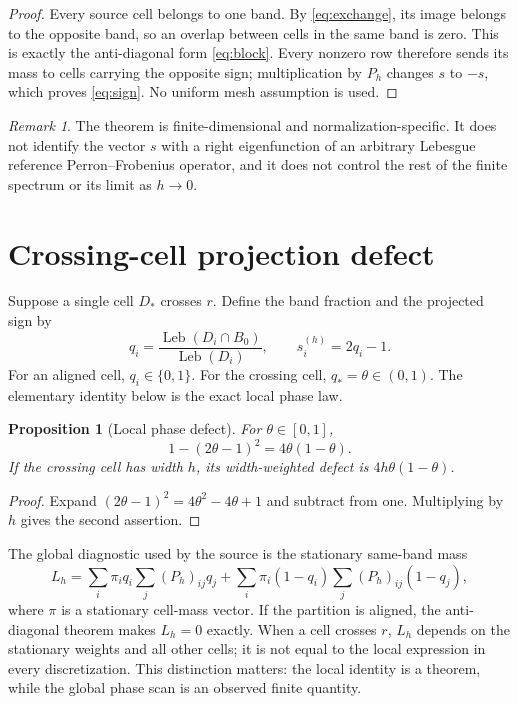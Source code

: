 \documentclass[11pt]{article}
\newtheorem{proposition}[theorem]{Proposition}
\theoremstyle{definition}
\theoremstyle{remark}
\newtheorem{remark}[theorem]{Remark}
\newcommand{\Bzero}{B_0}
\newcommand{\Leb}{\operatorname{Leb}}
\begin{document}
\begin{proof}
Every source cell belongs to one band.  By \eqref{eq:exchange}, its image
belongs to the opposite band, so an overlap between cells in the same band is
zero.  This is exactly the anti-diagonal form \eqref{eq:block}.  Every
nonzero row therefore sends its mass to cells carrying the opposite sign;
multiplication by $P_h$ changes $s$ to $-s$, which proves \eqref{eq:sign}.
No uniform mesh assumption is used.
\end{proof}

\begin{remark}
The theorem is finite-dimensional and normalization-specific.  It does not
identify the vector $s$ with a right eigenfunction of an arbitrary Lebesgue
reference Perron--Frobenius operator, and it does not control the rest of the
finite spectrum or its limit as $h\to0$.
\end{remark}

\section{Crossing-cell projection defect}

Suppose a single cell $D_*$ crosses $r$.  Define the band fraction and the
projected sign by
\begin{equation}
 q_i=\frac{\Leb(D_i\cap\Bzero)}{\Leb(D_i)},
 \qquad s_i^{(h)}=2q_i-1.
 \label{eq:q}
\end{equation}
For an aligned cell, $q_i\in\{0,1\}$.  For the crossing cell,
$q_* =\theta\in(0,1)$.  The elementary identity below is the exact local
phase law.

\begin{proposition}[Local phase defect]\label{prop:defect}
For $\theta\in[0,1]$,
\begin{equation}
 1-(2\theta-1)^2=4\theta(1-\theta).
 \label{eq:identity}
\end{equation}
If the crossing cell has width $h$, its width-weighted defect is
$4h\theta(1-\theta)$.
\end{proposition}

\begin{proof}
Expand $(2\theta-1)^2=4\theta^2-4\theta+1$ and subtract from one.
Multiplying by $h$ gives the second assertion.
\end{proof}

The global diagnostic used by the source is the stationary same-band mass
\begin{equation}
 L_h=\sum_i\pi_iq_i\sum_j(P_h)_{ij}q_j
 +\sum_i\pi_i(1-q_i)\sum_j(P_h)_{ij}(1-q_j),
 \label{eq:global}
\end{equation}
where $\pi$ is a stationary cell-mass vector.  If the partition is aligned,
the anti-diagonal theorem makes $L_h=0$ exactly.  When a cell crosses $r$,
$L_h$ depends on the stationary weights and all other cells; it is not equal
to the local expression in every discretization.  This distinction matters:
the local identity is a theorem, while the global phase scan is an observed
finite quantity.
\end{document}
